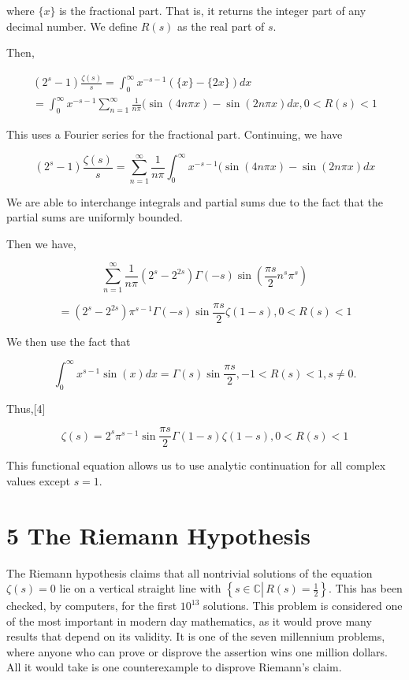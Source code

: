 \documentclass[10pt]{article}
\begin{document}
where $\{x\}$ is the fractional part. That is, it returns the integer part of any decimal number. We define $R(s)$ as the real part of $s$.

Then,

$$
\begin{gathered}
\left(2^{s}-1\right) \frac{\zeta(s)}{s}=\int_{0}^{\infty} x^{-s-1}(\{x\}-\{2 x\}) d x \\
=\int_{0}^{\infty} x^{-s-1} \sum_{n=1}^{\infty} \frac{1}{n \pi}(\sin (4 n \pi x)-\sin (2 n \pi x) d x, 0<R(s)<1
\end{gathered}
$$

This uses a Fourier series for the fractional part. Continuing, we have

$$
\left(2^{s}-1\right) \frac{\zeta(s)}{s}=\sum_{n=1}^{\infty} \frac{1}{n \pi} \int_{0}^{\infty} x^{-s-1}(\sin (4 n \pi x)-\sin (2 n \pi x) d x
$$

We are able to interchange integrals and partial sums due to the fact that the partial sums are uniformly bounded.

Then we have,

$$
\sum_{n=1}^{\infty} \frac{1}{n \pi}\left(2^{s}-2^{2 s}\right) \Gamma(-s) \sin \left(\frac{\pi s}{2} n^{s} \pi^{s}\right)
$$

$$
=\left(2^{s}-2^{2 s}\right) \pi^{s-1} \Gamma(-s) \sin \frac{\pi s}{2} \zeta(1-s), 0<R(s)<1
$$

We then use the fact that

$$
\int_{0}^{\infty} x^{s-1} \sin (x) d x=\Gamma(s) \sin \frac{\pi s}{2},-1<R(s)<1, s \neq 0 .
$$

Thus,[4]

$$
\zeta(s)=2^{s} \pi^{s-1} \sin \frac{\pi s}{2} \Gamma(1-s) \zeta(1-s), 0<R(s)<1
$$

This functional equation allows us to use analytic continuation for all complex values except $s=1$.

\section*{5 The Riemann Hypothesis}
The Riemann hypothesis claims that all nontrivial solutions of the equation $\zeta(s)=0$ lie on a vertical straight line with $\left\{s \in \mathbb{C} \left\lvert\, R(s)=\frac{1}{2}\right.\right\}$. This has been checked, by computers, for the first $10^{13}$ solutions. This problem is considered one of the most important in modern day mathematics, as it would prove many results that depend on its validity. It is one of the seven millennium problems, where anyone who can prove or disprove the assertion wins one million dollars. All it would take is one counterexample to disprove Riemann's claim.
\end{document}
